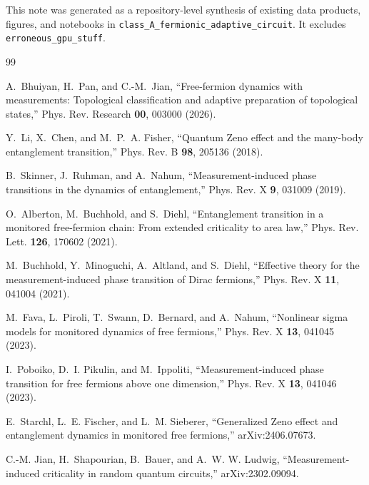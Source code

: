 \documentclass[aps,twocolumn,floatfix,superscriptaddress,nofootinbib]{revtex4-2}
\begin{document}
\begin{acknowledgments}
This note was generated as a repository-level synthesis of existing data products, figures,
and notebooks in \texttt{class\_A\_fermionic\_adaptive\_circuit}.  It excludes
\texttt{erroneous\_gpu\_stuff}.
\end{acknowledgments}

\begin{thebibliography}{99}

A.~Bhuiyan, H.~Pan, and C.-M.~Jian,
``Free-fermion dynamics with measurements: Topological classification and adaptive preparation of topological states,''
Phys. Rev. Research \textbf{00}, 003000 (2026).

Y.~Li, X.~Chen, and M.~P.~A. Fisher,
``Quantum Zeno effect and the many-body entanglement transition,''
Phys. Rev. B \textbf{98}, 205136 (2018).

B.~Skinner, J.~Ruhman, and A.~Nahum,
``Measurement-induced phase transitions in the dynamics of entanglement,''
Phys. Rev. X \textbf{9}, 031009 (2019).

O.~Alberton, M.~Buchhold, and S.~Diehl,
``Entanglement transition in a monitored free-fermion chain: From extended criticality to area law,''
Phys. Rev. Lett. \textbf{126}, 170602 (2021).

M.~Buchhold, Y.~Minoguchi, A.~Altland, and S.~Diehl,
``Effective theory for the measurement-induced phase transition of Dirac fermions,''
Phys. Rev. X \textbf{11}, 041004 (2021).

M.~Fava, L.~Piroli, T.~Swann, D.~Bernard, and A.~Nahum,
``Nonlinear sigma models for monitored dynamics of free fermions,''
Phys. Rev. X \textbf{13}, 041045 (2023).

I.~Poboiko, D.~I. Pikulin, and M.~Ippoliti,
``Measurement-induced phase transition for free fermions above one dimension,''
Phys. Rev. X \textbf{13}, 041046 (2023).

E.~Starchl, L.~E. Fischer, and L.~M. Sieberer,
``Generalized Zeno effect and entanglement dynamics in monitored free fermions,''
arXiv:2406.07673.

C.-M. Jian, H.~Shapourian, B.~Bauer, and A.~W. W. Ludwig,
``Measurement-induced criticality in random quantum circuits,''
arXiv:2302.09094.


\end{thebibliography}
\end{document}
